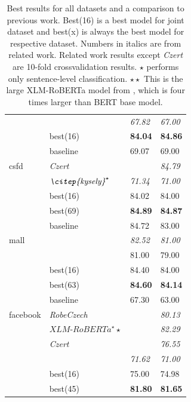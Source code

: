 \begin{table}[!h]
\begin{tabular}{|l|l||ll|}
                           & \textit{\citep{kysely}} & \textit{67.82} & \textit{67.00} \\ \cline{2-4}
                           & best(16)    & \textbf{84.04} & \textbf{84.86} \\ \hline \hline
\multirow{3}{*}{csfd}      & baseline    & 69.07 & 69.00 \\ \cline{2-4} 
& \textit{Czert}       &       & \textit{84.79} \\ \cline{2-4} 
& $\textit{\citep{kysely}}^\star$ & \textit{71.34} & \textit{71.00} \\ \cline{2-4}
                           & best(16)    & 84.02 & 84.00\\ \cline{2-4} 
                           & best(69)    & \textbf{84.89 }& \textbf{84.87} \\ \hline \hline
\multirow{3}{*}{mall}      & baseline    & 84.72 & 83.00 \\ \cline{2-4} 
& \textit{\citep{kysely}} & \textit{82.52} & \textit{81.00} \\ \cline{2-4}
& \textit{\citep{Klouda}} & 81.00 & 79.00 \\ \cline{2-4}
                           & best(16)    & 84.40 & 84.00 \\ \cline{2-4} 
                           & best(63)    & \textbf{84.60} & \textbf{84.14} \\ \hline \hline
\multirow{3}{*}{facebook}  & baseline    & 67.30 & 63.00 \\ \cline{2-4} 
& \textit{RobeCzech }  &       & \textit{80.13} \\ \cline{2-4} 
& $\textit{XLM-RoBERTa}^\star\star$ &       & \textit{82.29} \\ \cline{2-4} 
& \textit{Czert}       &       & \textit{76.55} \\ \cline{2-4} 
& \textit{\citep{kysely}} & \textit{71.62} & \textit{71.00} \\ \cline{2-4}
                           & best(16)    & 75.00 & 74.98 \\ \cline{2-4} 
                           & best(45)    & \textbf{81.80} & \textbf{81.65} \\ \hline
\end{tabular}
\caption{Best results for all datasets and a comparison to previous work. Best(16) is a best model for joint dataset and best(x) is always the best model for respective dataset. Numbers in italics are from related work. Related work results except \textit{Czert} are 10-fold crossvalidation results. $\star$ \citep{kysely} performs only sentence-level classification. $\star\star$ This is the large XLM-RoBERTa model from \citep{Straka2021}, which is four times larger than BERT base model.  }
\label{tab:res_sent_best}
\end{table}

